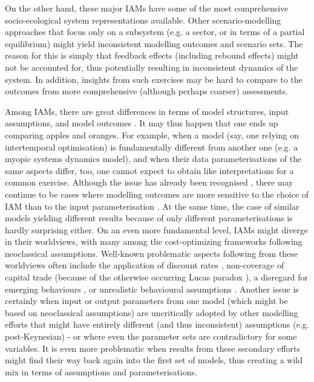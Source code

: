 \documentclass{article}
\begin{document}
\begin{refsection}
On the other hand, these major IAMs have some of the most comprehensive socio-ecological system representations available. Other scenario-modelling approaches that focus only on a subsystem (e.g. a sector, or in terms of a partial equilibrium) might yield inconsistent modelling outcomes and scenario sets. The reason for this is simply that feedback effects (including rebound effects) might not be accounted for, thus potentially resulting in inconsistent dynamics of the system. In addition, insights from such exercises may be hard to compare to the outcomes from more comprehensive (although perhaps coarser) assessments.

Among IAMs, there are great differences in terms of model structures, input assumptions, and model outcomes \parencite{krey_2014,krey_2019,hiroto_2020,keppo_2021}. It may thus happen that one ends up comparing apples and oranges. For example, when a model (say, one relying on intertemporal optimisation) is fundamentally different from another one (e.g. a myopic systems dynamics model), and when their data parameterisations of the same aspects differ, too, one cannot expect to obtain like interpretations for a common exercise.\footnotemark{} Although the issue has already been recognised \parencite{giarola_2021}, there may continue to be cases where modelling outcomes are more sensitive to the choice of IAM than to the input parameterisation \parencite{sognnaes_2021}. At the same time, the case of similar models yielding different results because of only different parameterisations is hardly surprising either. On an even more fundamental level, IAMs might diverge in their worldviews, with many among the cost-optimizing frameworks following neoclassical assumptions. Well-known problematic aspects following from these worldviews often include the application of discount rates \parencite{emmerling_2019}, non-coverage  of capital trade (because of the otherwise occurring Lucas paradox \parencite{lucas_1990,keppo_2021}), a disregard for emerging behaviours \parencite{farmer_2015}, or unrealistic behavioural assumptions \parencite{asefi_2021}. Another issue is certainly when input or output parameters from one model (which might be based on neoclassical assumptions) are uncritically adopted by other modelling efforts that might have entirely different (and thus inconsistent) assumptions (e.g. post-Keynesian) - or where even the parameter sets are contradictory for some variables. It is even more problematic when results from these secondary efforts might find their way back again into the first set of models, thus creating a wild mix in terms of assumptions and parameterisations.\footnotemark{}


\end{refsection}
\end{document}
